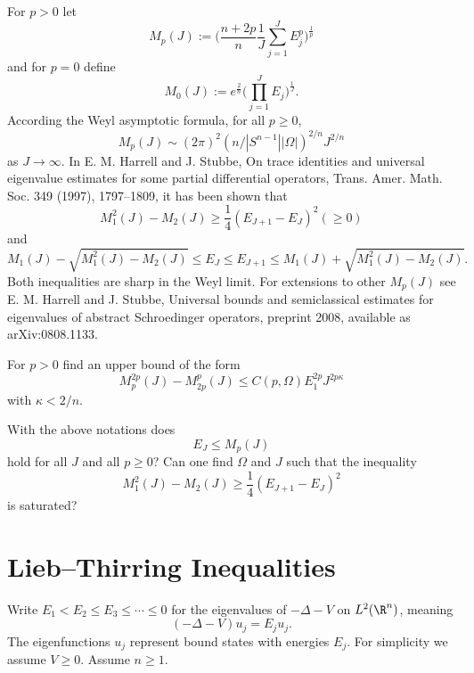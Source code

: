 \documentclass[12pt,letterpaper, reqno]{amsart}
\begin{document}
\begin{problemblock}
For $p>0$ let
$$
    M_{p}(J):=\bigg(\frac{n+2p}{n}\frac1{J}\sum_{j=1}^JE_j^p\bigg)^{\frac1{p}}
$$
and for $p=0$ define
$$
    M_{0}(J):=e^{\frac{2}{n}}\bigg(\prod_{j=1}^JE_j\bigg)^{\frac1{J}}.
$$
According the Weyl asymptotic formula, for all $p\geq 0$,
$$
    M_{p}(J) \sim (2\pi)^2(n/|S^{n-1}||\Omega|)^{2/n}J^{2/n}
$$
as $J\rightarrow\infty$. In E. M. Harrell and J. Stubbe, On trace identities and
universal eigenvalue estimates for some partial differential
operators, {Trans. Amer. Math. Soc.} {349} (1997),
1797--1809, it has been shown that
$$
    M_1^2(J)-M_{2}(J)\geq \frac1{4}(E_{J+1}-E_J)^2 (\geq 0)
$$
and
$$
    M_1(J)-\sqrt{M_1^2(J)-M_{2}(J)}\leq E_J\leq E_{J+1}\leq
    M_1(J)+\sqrt{M_1^2(J)-M_{2}(J)}.
$$
Both inequalities are sharp in the Weyl limit. For extensions to
other $M_p(J)$ see E. M. Harrell and J. Stubbe, Universal bounds and
semiclassical estimates for eigenvalues of abstract Schroedinger
operators, preprint 2008, available as arXiv:0808.1133.

\begin{problem}[1.6]
For $p>0$ find an upper bound of
the form
$$
    M_p^{2p}(J)-M_{2p}^p(J)\leq C(p,\Omega)E_1^{2p}J^{2p\kappa}
$$
with $\kappa<2/n$.
\end{problem}

\end{problemblock}

\begin{problemblock}


\begin{problem}[1.65]
With the above notations does
$$
    E_J\leq M_p(J)
$$
hold for all $J$ and all $p\geq 0$?
Can one find $\Omega$ and $J$ such that the inequality
$$
    M_1^2(J)-M_{2}(J)\geq \frac1{4}(E_{J+1}-E_J)^2
$$
is saturated?
\end{problem}


\end{problemblock}


\section{Lieb--Thirring Inequalities}

Write $E_1 < E_2 \leq E_3 \leq \cdots \leq 0$
for the eigenvalues of $-\Delta - V$ on
$L^2(\R^n)$, meaning
\[
(-\Delta - V)u_j = E_j u_j .
\]
The eigenfunctions $u_j$ represent bound states with energies $E_j$.
For simplicity we assume $V \geq 0$. Assume $n \geq 1$.
\end{document}
